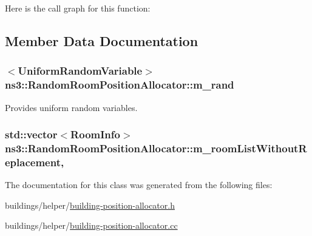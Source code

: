 Here is the call graph for this function\+:




\subsection{Member Data Documentation}
\subsubsection[{\texorpdfstring{m\+\_\+rand}{m_rand}}]{$<${\bf Uniform\+Random\+Variable}$>$ ns3\+::\+Random\+Room\+Position\+Allocator\+::m\+\_\+rand\hspace{0.3cm}{\ttfamily [private]}}\hypertarget{classns3_1_1RandomRoomPositionAllocator_ab516197adcf737e85bed980ecdeec062}{}\label{classns3_1_1RandomRoomPositionAllocator_ab516197adcf737e85bed980ecdeec062}


Provides uniform random variables. 

\subsubsection[{\texorpdfstring{m\+\_\+room\+List\+Without\+Replacement}{m_roomListWithoutReplacement}}]{\setlength{\rightskip}{0pt plus 5cm}std\+::vector$<${\bf Room\+Info}$>$ ns3\+::\+Random\+Room\+Position\+Allocator\+::m\+\_\+room\+List\+Without\+Replacement\hspace{0.3cm}{\ttfamily [mutable]}, {\ttfamily [private]}}\hypertarget{classns3_1_1RandomRoomPositionAllocator_a61c7c59ae97a661cda08996305d9e1c6}{}\label{classns3_1_1RandomRoomPositionAllocator_a61c7c59ae97a661cda08996305d9e1c6}


The documentation for this class was generated from the following files\+:\begin{DoxyCompactItemize}
\item 
buildings/helper/\hyperlink{building-position-allocator_8h}{building-\/position-\/allocator.\+h}\item 
buildings/helper/\hyperlink{building-position-allocator_8cc}{building-\/position-\/allocator.\+cc}\end{DoxyCompactItemize}
